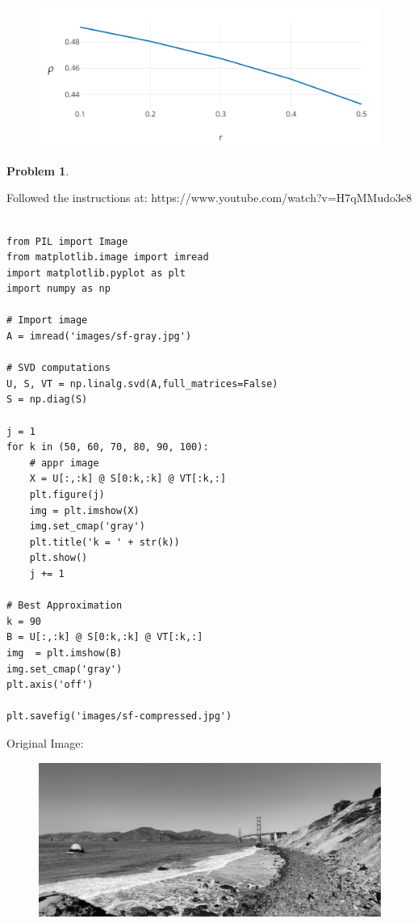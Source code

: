 \documentclass[11pt]{article}
\theoremstyle{definition}
\theoremstyle{case}
\theoremstyle{theorem}
\newtheorem{prob}{Problem}
\begin{document}
\begin{enumerate}[label=(\alph*)]
\begin{figure}[h!]
  \centering
  \includegraphics[totalheight=6cm]{images/graph.png}
\end{figure}

\end{enumerate}

\newpage

\begin{prob}
\end{prob}

Followed the instructions at: https://www.youtube.com/watch?v=H7qMMudo3e8

\begin{verbatim}

from PIL import Image
from matplotlib.image import imread
import matplotlib.pyplot as plt
import numpy as np

# Import image
A = imread('images/sf-gray.jpg')

# SVD computations
U, S, VT = np.linalg.svd(A,full_matrices=False)
S = np.diag(S)

j = 1
for k in (50, 60, 70, 80, 90, 100):
    # appr image
    X = U[:,:k] @ S[0:k,:k] @ VT[:k,:]
    plt.figure(j)
    img = plt.imshow(X)
    img.set_cmap('gray')
    plt.title('k = ' + str(k))
    plt.show()
    j += 1

# Best Approximation
k = 90
B = U[:,:k] @ S[0:k,:k] @ VT[:k,:]
img  = plt.imshow(B)
img.set_cmap('gray')
plt.axis('off')

plt.savefig('images/sf-compressed.jpg')

\end{verbatim}

\newpage

Original Image:

\begin{figure}[h!]
  \centering
  \includegraphics[totalheight=6cm]{images/sf-gray.jpg}
\end{figure}
\end{document}
